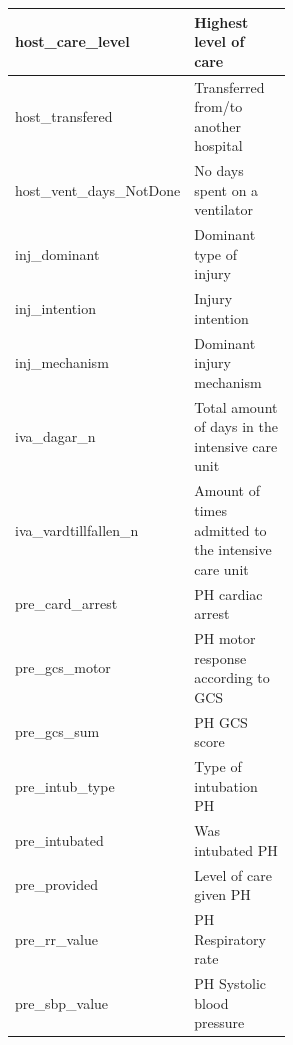 \documentclass[12pt, a4paper]{article}
\begin{document}
\begin{appendices}
\begin{longtable}[c]{@{}|l|p{0.55\linewidth}|@{}}
        host\_care\_level                           & Highest level of care                                             \\\hline
        host\_transfered                            & Transferred from/to another hospital                              \\\hline
        host\_vent\_days\_NotDone                   & No days spent on a ventilator                                     \\\hline
        inj\_dominant                               & Dominant type of injury                                           \\\hline
        inj\_intention                              & Injury intention                                                  \\\hline
        inj\_mechanism                              & Dominant injury mechanism                                         \\\hline
        iva\_dagar\_n                               & Total amount of days in the intensive care unit                   \\\hline
        iva\_vardtillfallen\_n                      & Amount of times admitted to the intensive care unit               \\\hline
        pre\_card\_arrest                           & PH cardiac arrest                                                 \\\hline
        pre\_gcs\_motor                             & PH motor response according to GCS                                \\\hline
        pre\_gcs\_sum                               & PH GCS score                                                      \\\hline
        pre\_intub\_type                            & Type of intubation PH                                             \\\hline
        pre\_intubated                              & Was intubated PH                                                  \\\hline
        pre\_provided                               & Level of care given PH                                            \\\hline
        pre\_rr\_value                              & PH Respiratory rate                                               \\\hline
        pre\_sbp\_value                             & PH Systolic blood pressure                                        \\\hline

\end{longtable}
\end{appendices}
\end{document}
